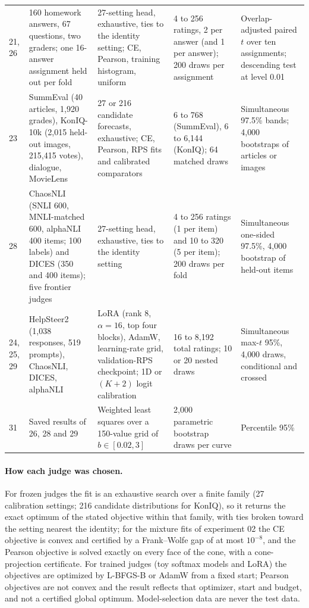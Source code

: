 \begin{table}[t]
\begin{tabular}{@{}p{}p{}p{}p{}p{}@{}}
21, 26 & 160 homework answers, 67 questions, two graders; one 16-answer assignment held out per fold & 27-setting head, exhaustive, ties to the identity setting; CE, Pearson, training histogram, uniform & 4 to 256 ratings, 2 per answer (and 1 per answer); 200 draws per assignment & Overlap-adjusted paired $t$ over ten assignments; descending test at level 0.01 \\
23 & SummEval (40 articles, 1{,}920 grades), KonIQ-10k (2{,}015 held-out images, 215{,}415 votes), dialogue, MovieLens & 27 or 216 candidate forecasts, exhaustive; CE, Pearson, RPS fits and calibrated comparators & 6 to 768 (SummEval), 6 to 6{,}144 (KonIQ); 64 matched draws & Simultaneous 97.5\% bands; 4{,}000 bootstraps of articles or images \\
28 & ChaosNLI (SNLI 600, MNLI-matched 600, alphaNLI 400 items; 100 labels) and DICES (350 and 400 items); five frontier judges & 27-setting head, exhaustive, ties to the identity setting & 4 to 256 ratings (1 per item) and 10 to 320 (5 per item); 200 draws per fold & Simultaneous one-sided 97.5\%, 4{,}000 bootstrap of held-out items \\
24, 25, 29 & HelpSteer2 (1{,}038 responses, 519 prompts), ChaosNLI, DICES, alphaNLI & LoRA (rank 8, $\alpha=16$, top four blocks), AdamW, learning-rate grid, validation-RPS checkpoint; 1D or $(K+2)$ logit calibration & 16 to 8{,}192 total ratings; 10 or 20 nested draws & Simultaneous max-$t$ 95\%, 4{,}000 draws, conditional and crossed \\
31 & Saved results of 26, 28 and 29 & Weighted least squares over a 150-value grid of $b\in[0.02,3]$ & 2{,}000 parametric bootstrap draws per curve & Percentile 95\% \\
\bottomrule
\end{tabular}
\end{table}

\paragraph{How each judge was chosen.}
For frozen judges the fit is an exhaustive search over a finite family (27 calibration settings; 216 candidate distributions for KonIQ), so it returns the exact optimum of the stated objective within that family, with ties broken toward the setting nearest the identity; for the mixture fits of experiment 02 the CE objective is convex and certified by a Frank--Wolfe gap of at most $10^{-8}$, and the Pearson objective is solved exactly on every face of the cone, with a cone-projection certificate.
For trained judges (toy softmax models and LoRA) the objectives are optimized by L-BFGS-B or AdamW from a fixed start; Pearson objectives are not convex and the result reflects that optimizer, start and budget, and not a certified global optimum.
Model-selection data are never the test data.
